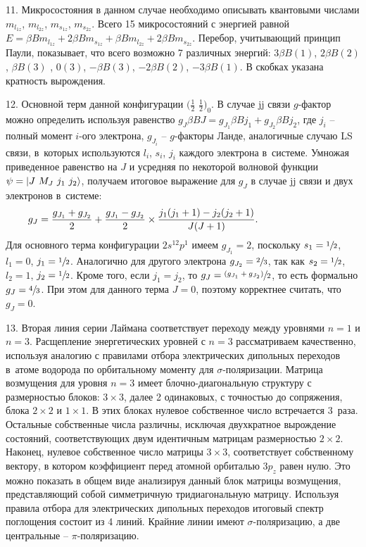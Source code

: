 11. Микросостояния в данном случае необходимо описывать квантовыми числами $m_{l_{1z}}$, $m_{l_{2z}}$, $m_{s_{1z}}$, $m_{s_{2z}}$. Всего 15 микросостояний с энергией равной $E=\beta B m_{l_{1z}} + 2 \beta B m_{s_{1z}} + \beta B m_{l_{2z}} + 2 \beta B m_{s_{2z}}$. Перебор, учитывающий принцип Паули, показывает, что всего возможно 7 различных энергий: $3 \beta B (1)$, $2 \beta B (2)$, $\beta B (3)$ , $0 (3)$, $-\beta B (3)$, $-2 \beta B (2)$, $-3 \beta B (1)$. В скобках указана кратность вырождения.\par
12. Основной терм данной конфигурации  $\Big( \frac12\,\,\frac12\Big)_{0}$. В случае jj связи $g$-фактор можно определить используя равенство $g_J\beta B J=g_{J_1}\beta B j_1+g_{J_2}\beta B j_2$, где $j_i$ – полный момент $i$-ого электрона, $g_{J_i}$ – $g$-факторы Ланде, аналогичные случаю LS связи, в~которых используются $l_i$, $s_i$, $j_i$ каждого электрона в~системе. Умножая приведенное равенство на $J$ и усредняя по некоторой волновой функции $\psi=\ket{J\,\,M_J\,\,j_1\,\,j_2}$, получаем итоговое выражение для $g_J$ в случае jj связи и двух электронов в~системе:
\begin{equation*}
\begin{aligned}
& g_J= \dfrac{g_{J_1}+g_{J_2}}{2}+ \dfrac{g_{J_1}-g_{J_2}}{2} \times  \dfrac{j_1(j_1+1) - j_2(j_2+1)}{J(J+1)}. \hspace{25mm}
\end{aligned}
\end{equation*}
Для основного терма конфигурации $2s^12p^1$ имеем $g_{J_1}=2$, поскольку $s_1=\sfrac12$, $l_1=0$, $j_1=\sfrac12$. Аналогично для другого электрона $g_{J_2}=\sfrac23$, так как $s_2=\sfrac12$, $l_2=1$, $j_2=\sfrac12$. Кроме того, если $j_1=j_2$, то $g_J=\sfrac{(g_{J_1}+g_{J_2})}{2}$, то есть формально $g_J=\sfrac43$. При этом для данного терма $J=0$, поэтому корректнее считать, что  $g_J=0$.\par
13. Вторая линия серии Лаймана соответствует переходу между уровнями $n=1$ и $n=3$. Расщепление энергетических уровней с $n=3$ рассматриваем качественно, используя аналогию с правилами отбора электрических дипольных переходов в~атоме водорода по орбитальному моменту для $\sigma$-поляризации. Матрица возмущения для уровня $n=3$ имеет блочно-диагональную структуру с размерностью блоков: $3 \times 3$, далее 2 одинаковых, с точностью до сопряжения, блока $2 \times 2$ и $1 \times 1$. В этих блоках нулевое собственное число встречается 3~раза. Остальные собственные числа различны, исключая двухкратное вырождение состояний, соответствующих двум идентичным матрицам размерностью $2 \times 2$. Наконец, нулевое собственное число матрицы $3 \times 3$, соответствует собственному вектору, в котором коэффициент перед атомной орбиталью $3p_z$ равен нулю. Это можно показать в общем виде анализируя данный блок матрицы возмущения, представляющий собой симметричную тридиагональную матрицу. Используя правила отбора для электрических дипольных переходов итоговый спектр поглощения состоит из 4 линий. Крайние линии имеют $\sigma$-поляризацию, а две центральные – $\pi$-поляризацию.\par
